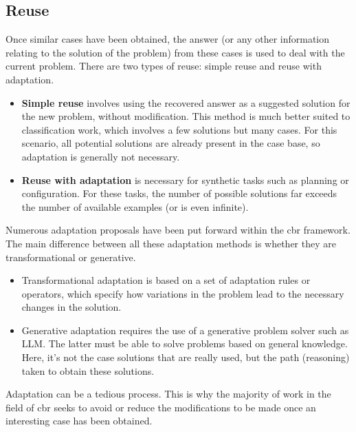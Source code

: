     \subsection{Reuse}
    Once similar cases have been obtained, the answer (or any other information relating to the solution of the problem) from these cases is used to deal with the current problem. There are two types of reuse: simple reuse and reuse with adaptation. 
    
    \begin{itemize}
        \item \textbf{Simple reuse} involves using the recovered answer as a suggested solution for the new problem, without modification. This method is much better suited to classification work, which involves a few solutions but many cases.  For this scenario, all potential solutions are already present in the case base, so adaptation is generally not necessary. 
        
        \item \textbf{Reuse with adaptation} is necessary for synthetic tasks such as planning or configuration. For these tasks, the number of possible solutions far exceeds the number of available examples (or is even infinite).
    \end{itemize}

    Numerous adaptation proposals have been put forward within the \acrshort{cbr} framework. The main difference between all these adaptation methods is whether they are transformational or generative.
    
    \begin{itemize}
        \item Transformational adaptation is based on a set of adaptation rules or operators, which specify how variations in the problem lead to the necessary changes in the solution.  
        
        \item Generative adaptation requires the use of a generative problem solver such as LLM. The latter must be able to solve problems based on general knowledge. Here, it's not the case solutions that are really used, but the path (reasoning) taken to obtain these solutions. 
    \end{itemize}

    Adaptation can be a tedious process. This is why the majority of work in the field of \acrshort{cbr} seeks to avoid or reduce the modifications to be made once an interesting case has been obtained.


